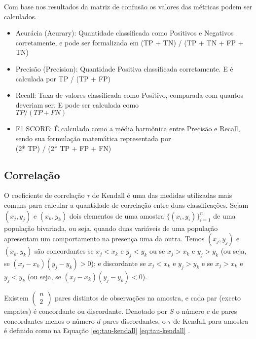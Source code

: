 Com base nos resultados da matriz de confusão os valores das métricas podem ser calculados.

\begin{itemize}
    \item Acurácia (Acurary): Quantidade classificada como Positivos e Negativos corretamente, e pode ser formalizada em (TP + TN) / (TP + TN + FP + TN)
    \item Precisão (Precision): Quantidade Positiva classificada corretamente. E é calculada por TP / (TP + FP)
    \item Recall: Taxa de valores classificada como Positivo, comparada com quantos deveriam ser. E pode ser calculada como  \\
    $TP / (TP + FN)$
    \item F1 SCORE: É calculado como a média harmônica entre Precisão e Recall, sendo sua formulação matemática representada por \\ 
    (2* TP) / (2* TP + FP + FN) 
\end{itemize}


\subsection{Correlação }\label{sec:LABEL_CHP_4_SEC_A_SUB_H}

O coeficiente de correlação $\tau$ de Kendall é uma das medidas utilizadas mais comuns para calcular a quantidade de correlação entre duas classificações. Sejam $( x_j, y_j )$ e $( x _ { k } , y _ { k } )$ dois elementos de uma amostra $\{ ( x _ { i } , y _ { i } ) \} _ { i = 1 } ^ { n }$ de uma população bivariada, ou seja, quando duas variáveis de uma população apresentam um comportamento na presença uma da outra. Temos  $( x_j, y_j )$ e $( x _ { k } , y _ { k } )$ são concordantes se $x _ { j } < x _ { k }$ e $y _ { j } < y _ { k }$ ou se $x _ { j } > x _ { k }$ e $y _ { j } > y _ { k }$ (ou seja, se $( x _ { j } - x _ { k } ) ( y _ { j } - y _ { k } ) > 0$); e discordante se $x _ { j } < x _ { k }$ e $y _ { j } > y _ { k }$ e se $x _ { j } > x _ { k }$ e $y _ { j } < y _ { k }$ (ou seja, se $( x _ { j } - x _ { k } ) ( y _ { j } - y _ { k } ) < 0$). 

Existem $\left( \begin{array} { l } { n } \\ { 2 } \end{array} \right)$ pares distintos de observações na amostra, e cada par (exceto empates) é concordante ou discordante. Denotado por $S$ o número $c$ de pares concordantes menos o número $d$ pares discordantes, o $\tau$ de Kendall para amostra é definido como na Equação \ref{eq:tau-kendall} \ref{eq:tau-kendall} \cite{art:kendall2010}\cite{kendall1938new} \cite{kendall1970rank}.


